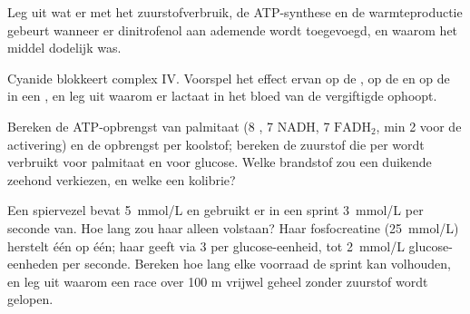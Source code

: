 \begin{exercise}[$\star\star$]\label{exo:b1:respiration-fermentation:8}
Leg uit wat er met het zuurstofverbruik, de ATP-synthese en de warmteproductie
gebeurt wanneer er dinitrofenol aan ademende  wordt toegevoegd, en
waarom het middel dodelijk was.
\end{exercise}

\begin{exercise}[$\star\star$]\label{exo:b1:respiration-fermentation:9}
Cyanide blokkeert complex IV. Voorspel het effect ervan op de , op
de  en op de  in een , en leg uit waarom er lactaat in het
bloed van de vergiftigde ophoopt.
\end{exercise}

\begin{exercise}[$\star\star\star$]\label{exo:b1:respiration-fermentation:10}
Bereken de ATP-opbrengst van palmitaat (8 , 7 NADH, 7
$\mathrm{FADH_2}$, min 2  voor de activering) en de opbrengst per koolstof;
bereken de zuurstof die per  wordt verbruikt voor palmitaat en voor glucose.
Welke brandstof zou een duikende zeehond verkiezen, en welke een kolibrie?
\end{exercise}

\begin{exercise}[$\star\star\star$]\label{exo:b1:respiration-fermentation:11}
Een spiervezel bevat \qty{5}{mmol/L}  en gebruikt er in een sprint
\qty{3}{mmol/L} per seconde van. Hoe lang zou haar  alleen volstaan? Haar
fosfocreatine (\qty{25}{mmol/L}) herstelt  één op één; haar  geeft via
 3  per glucose-eenheid, tot \qty{2}{mmol/L} glucose-eenheden per
seconde. Bereken hoe lang elke voorraad de sprint kan volhouden, en leg uit waarom
een race over 100 m vrijwel geheel zonder zuurstof wordt gelopen.
\end{exercise}

